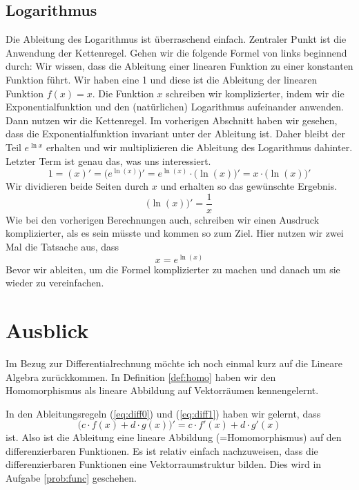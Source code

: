 \subsection{Logarithmus}
Die Ableitung des Logarithmus ist überraschend einfach. Zentraler Punkt ist die Anwendung der Kettenregel.  Gehen wir die folgende Formel von links beginnend durch: Wir wissen, dass die Ableitung einer linearen Funktion zu einer konstanten Funktion führt. Wir haben eine 1 und diese ist die Ableitung der linearen Funktion $f(x) = x$. Die Funktion $x$ schreiben wir komplizierter, indem wir die Exponentialfunktion und den (natürlichen) Logarithmus aufeinander anwenden. Dann nutzen wir die Kettenregel. Im vorherigen Abschnitt haben wir gesehen, dass die Exponentialfunktion invariant unter der Ableitung ist. Daher bleibt der Teil $e^{\ln x}$ erhalten und wir multiplizieren die Ableitung des Logarithmus dahinter. Letzter Term ist genau das, was uns interessiert. 
\begin{equation}
1 = (x)' = \big(e^{\ln(x)}\big)' = e^{\ln(x)}\cdot \big( \ln(x) \big)' = x \cdot \big( \ln(x) \big)'
\end{equation}
Wir dividieren beide Seiten durch $x$ und erhalten so das gewünschte Ergebnis.
\begin{equation}
\big( \ln(x) \big)' = \frac{1}{x}
\end{equation}
Wie bei den vorherigen Berechnungen auch, schreiben wir einen Ausdruck komplizierter, als es sein müsste und kommen so zum Ziel. Hier nutzen wir zwei Mal die Tatsache aus, dass
\begin{equation*}
x = e^{\ln(x)}
\end{equation*}
Bevor wir ableiten, um die Formel komplizierter zu machen und danach um sie wieder zu vereinfachen.

\section{Ausblick}

Im Bezug zur Differentialrechnung möchte ich noch einmal kurz auf die Lineare Algebra zurückkommen. In Definition \ref{def:homo} haben wir den Homomorphismus als lineare Abbildung auf Vektorräumen kennengelernt. 

In den Ableitungsregeln (\ref{eq:diff0}) und (\ref{eq:diff1}) haben wir gelernt, dass 
\begin{equation}
\big(c\cdot f(x) + d\cdot g(x)\big)' = c\cdot f'(x) + d\cdot g'(x)
\end{equation}
ist. Also ist die Ableitung eine lineare Abbildung (=Homomorphismus) auf den differenzierbaren Funktionen. Es ist relativ einfach nachzuweisen, dass die differenzierbaren Funktionen eine Vektorraumstruktur bilden. Dies wird in Aufgabe \ref{prob:func} geschehen.

